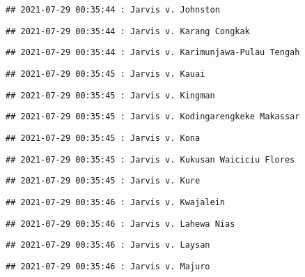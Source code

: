 \documentclass[
]{article}
\begin{document}
\begin{verbatim}
## 2021-07-29 00:35:44 : Jarvis v. Johnston
\end{verbatim}

\begin{verbatim}
## 2021-07-29 00:35:44 : Jarvis v. Karang Congkak
\end{verbatim}

\begin{verbatim}
## 2021-07-29 00:35:44 : Jarvis v. Karimunjawa-Pulau Tengah
\end{verbatim}

\begin{verbatim}
## 2021-07-29 00:35:45 : Jarvis v. Kauai
\end{verbatim}

\begin{verbatim}
## 2021-07-29 00:35:45 : Jarvis v. Kingman
\end{verbatim}

\begin{verbatim}
## 2021-07-29 00:35:45 : Jarvis v. Kodingarengkeke Makassar
\end{verbatim}

\begin{verbatim}
## 2021-07-29 00:35:45 : Jarvis v. Kona
\end{verbatim}

\begin{verbatim}
## 2021-07-29 00:35:45 : Jarvis v. Kukusan Waiciciu Flores
\end{verbatim}

\begin{verbatim}
## 2021-07-29 00:35:45 : Jarvis v. Kure
\end{verbatim}

\begin{verbatim}
## 2021-07-29 00:35:46 : Jarvis v. Kwajalein
\end{verbatim}

\begin{verbatim}
## 2021-07-29 00:35:46 : Jarvis v. Lahewa Nias
\end{verbatim}

\begin{verbatim}
## 2021-07-29 00:35:46 : Jarvis v. Laysan
\end{verbatim}

\begin{verbatim}
## 2021-07-29 00:35:46 : Jarvis v. Majuro
\end{verbatim}
\end{document}
